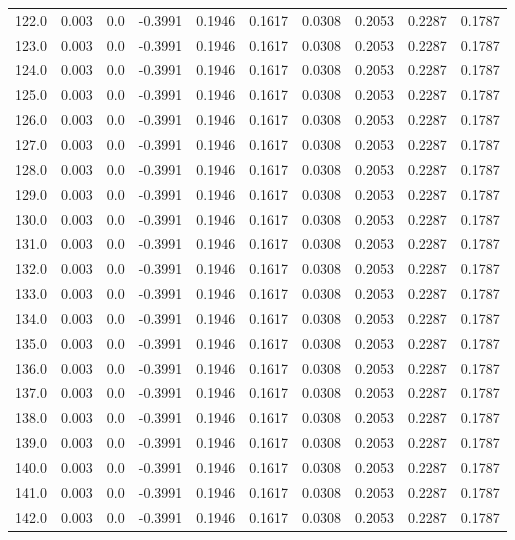 \begin{longtable}{lrrrrrrrrr}
122.0 & 0.003 & 0.0 & -0.3991 & 0.1946 & 0.1617 & 0.0308 & 0.2053 & 0.2287 & 0.1787 \\
123.0 & 0.003 & 0.0 & -0.3991 & 0.1946 & 0.1617 & 0.0308 & 0.2053 & 0.2287 & 0.1787 \\
124.0 & 0.003 & 0.0 & -0.3991 & 0.1946 & 0.1617 & 0.0308 & 0.2053 & 0.2287 & 0.1787 \\
125.0 & 0.003 & 0.0 & -0.3991 & 0.1946 & 0.1617 & 0.0308 & 0.2053 & 0.2287 & 0.1787 \\
126.0 & 0.003 & 0.0 & -0.3991 & 0.1946 & 0.1617 & 0.0308 & 0.2053 & 0.2287 & 0.1787 \\
127.0 & 0.003 & 0.0 & -0.3991 & 0.1946 & 0.1617 & 0.0308 & 0.2053 & 0.2287 & 0.1787 \\
128.0 & 0.003 & 0.0 & -0.3991 & 0.1946 & 0.1617 & 0.0308 & 0.2053 & 0.2287 & 0.1787 \\
129.0 & 0.003 & 0.0 & -0.3991 & 0.1946 & 0.1617 & 0.0308 & 0.2053 & 0.2287 & 0.1787 \\
130.0 & 0.003 & 0.0 & -0.3991 & 0.1946 & 0.1617 & 0.0308 & 0.2053 & 0.2287 & 0.1787 \\
131.0 & 0.003 & 0.0 & -0.3991 & 0.1946 & 0.1617 & 0.0308 & 0.2053 & 0.2287 & 0.1787 \\
132.0 & 0.003 & 0.0 & -0.3991 & 0.1946 & 0.1617 & 0.0308 & 0.2053 & 0.2287 & 0.1787 \\
133.0 & 0.003 & 0.0 & -0.3991 & 0.1946 & 0.1617 & 0.0308 & 0.2053 & 0.2287 & 0.1787 \\
134.0 & 0.003 & 0.0 & -0.3991 & 0.1946 & 0.1617 & 0.0308 & 0.2053 & 0.2287 & 0.1787 \\
135.0 & 0.003 & 0.0 & -0.3991 & 0.1946 & 0.1617 & 0.0308 & 0.2053 & 0.2287 & 0.1787 \\
136.0 & 0.003 & 0.0 & -0.3991 & 0.1946 & 0.1617 & 0.0308 & 0.2053 & 0.2287 & 0.1787 \\
137.0 & 0.003 & 0.0 & -0.3991 & 0.1946 & 0.1617 & 0.0308 & 0.2053 & 0.2287 & 0.1787 \\
138.0 & 0.003 & 0.0 & -0.3991 & 0.1946 & 0.1617 & 0.0308 & 0.2053 & 0.2287 & 0.1787 \\
139.0 & 0.003 & 0.0 & -0.3991 & 0.1946 & 0.1617 & 0.0308 & 0.2053 & 0.2287 & 0.1787 \\
140.0 & 0.003 & 0.0 & -0.3991 & 0.1946 & 0.1617 & 0.0308 & 0.2053 & 0.2287 & 0.1787 \\
141.0 & 0.003 & 0.0 & -0.3991 & 0.1946 & 0.1617 & 0.0308 & 0.2053 & 0.2287 & 0.1787 \\
142.0 & 0.003 & 0.0 & -0.3991 & 0.1946 & 0.1617 & 0.0308 & 0.2053 & 0.2287 & 0.1787 \\

\end{longtable}
